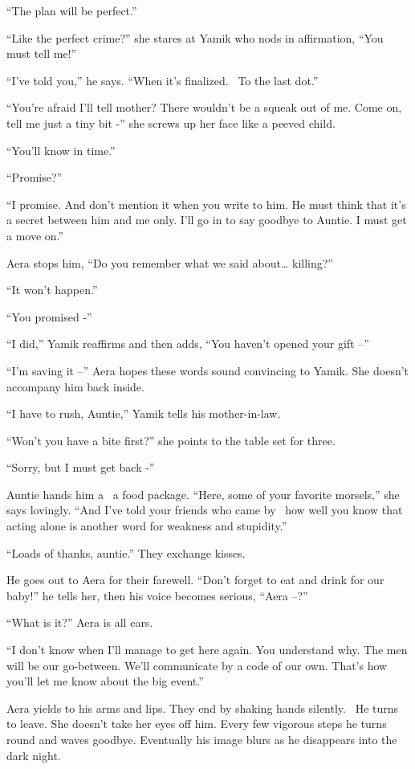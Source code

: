 \documentclass[twoside,11pt]{book}
\begin{document}
``The plan will be perfect.''

``Like the perfect crime?'' she stares at Yamik who nods in affirmation, ``You must tell me!''


``I've told you,'' he says. ``When it's finalized.~ To the last dot.''

``You're afraid I'll tell mother? There wouldn't be a squeak out of me. Come on, tell me just a tiny bit
-'' she screws up her face like a peeved child.

``You'll know in time.''

``Promise?''

``I promise. And don't mention it when you write to him. He must think that it's a secret between him and
me only. I'll go in to say goodbye to Auntie. I must get a move on.''

Aera stops him, ``Do you remember what we said about{\dots} killing?''

``It won't happen.''

``You promised -''

``I did,'' Yamik reaffirms and then adds, ``You haven't opened your gift
--''

``I'm saving it --'' Aera hopes these words sound convincing to Yamik. She doesn't accompany
him back inside.

``I have to rush, Auntie,'' Yamik tells his mother-in-law.

``Won't you have a bite first?'' she points to the table set for three.

``Sorry, but I must get back -''

Auntie hands him a \ a food package. ``Here, some of your favorite morsels,'' she says
lovingly. ``And I've told your friends who came by \ how well you know that acting alone is another word
for weakness and stupidity.''

``Loads of thanks, auntie.'' They exchange kisses.

He goes out{ }to Aera for their farewell. ``Don't forget to eat and drink for our
baby!'' he tells her, then his voice becomes serious, ``Aera --?''

``What is it?'' Aera is all ears.

``I don't know when I'll manage to get here again. You understand why. The men will be our go-between.
We'll communicate by a code of our own. That's how you'll let me know about the big event.''

Aera yields to his arms and lips. They end by shaking hands silently. ~He turns to leave. She doesn't take her eyes off
him. Every few vigorous steps he turns round and waves goodbye. Eventually his image blurs as he disappears into the
dark night.
\end{document}
